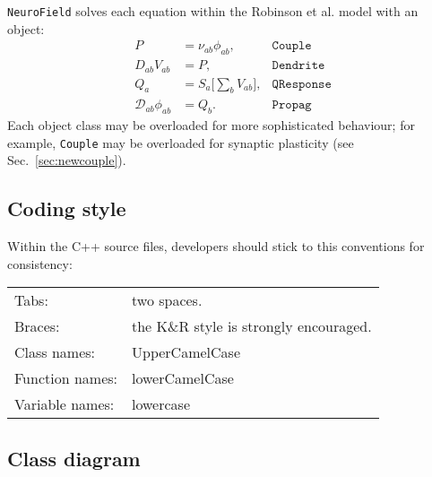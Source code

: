 \documentclass[12pt,a4paper]{article}
\newcommand{\type}[1]{ {\small\small\tt #1} }
\newcommand{\NF}[0]{ \type{NeuroField}}
\begin{document}
\NF solves each equation within the Robinson et al. model with an object:
\begin{align*}
	P &= \nu_{ab}\phi_{ab}, & \mathtt{Couple}\\
	D_{ab}V_{ab} &= P, & \mathtt{Dendrite}\\
	Q_a &= S_a \big[\sum_b V_{ab} \big], & \mathtt{QResponse}\\
	\mathcal{D}_{ab}\phi_{ab} &= Q_b.&  \mathtt{Propag}
\end{align*}
Each object class may be overloaded for more sophisticated behaviour; for example, \type{Couple} may be overloaded for synaptic plasticity (see Sec.~\ref{sec:newcouple}).

\subsection{Coding style}

Within the C++ source files, developers should stick to this conventions for consistency:

\begin{tabular}{ l l }
	Tabs:& two spaces.\\
	Braces:& the K\&R style is strongly encouraged.\\
	Class names:&UpperCamelCase\\
	Function names:&lowerCamelCase\\
	Variable names:&lowercase
\end{tabular}

\subsection{Class diagram}
\end{document}
